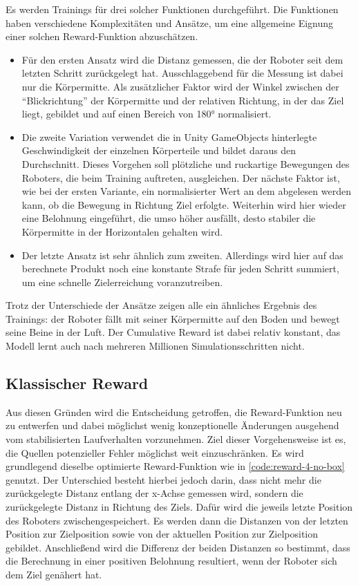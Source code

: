 Es werden Trainings für drei solcher Funktionen durchgeführt.
Die Funktionen haben verschiedene Komplexitäten und Ansätze, um eine allgemeine Eignung einer solchen Reward-Funktion abzuschätzen.
\begin{itemize}
    \item Für den ersten Ansatz wird die Distanz gemessen, die der Roboter seit dem letzten Schritt zurückgelegt hat.
    Ausschlaggebend für die Messung ist dabei nur die Körpermitte.
    Als zusätzlicher Faktor wird der Winkel zwischen der \enquote{Blickrichtung} der Körpermitte und der relativen Richtung, in der das Ziel liegt, gebildet und auf einen Bereich von 180° normalisiert.

    \item Die zweite Variation verwendet die in Unity GameObjects hinterlegte Geschwindigkeit der einzelnen Körperteile und bildet daraus den Durchschnitt.
    Dieses Vorgehen soll plötzliche und ruckartige Bewegungen des Roboters, die beim Training auftreten, ausgleichen.
    Der nächste Faktor ist, wie bei der ersten Variante, ein normalisierter Wert an dem abgelesen werden kann, ob die Bewegung in Richtung Ziel erfolgte.
    Weiterhin wird hier wieder eine Belohnung eingeführt, die umso höher ausfällt, desto stabiler die Körpermitte in der Horizontalen gehalten wird.

    \item Der letzte Ansatz ist sehr ähnlich zum zweiten.
    Allerdings wird hier auf das berechnete Produkt noch eine konstante Strafe für jeden Schritt summiert, um eine schnelle Zielerreichung voranzutreiben.
\end{itemize}

Trotz der Unterschiede der Ansätze zeigen alle ein ähnliches Ergebnis des Trainings: der Roboter fällt mit seiner Körpermitte auf den Boden und bewegt seine Beine in der Luft.
Der Cumulative Reward ist dabei relativ konstant, das Modell lernt auch nach mehreren Millionen Simulationsschritten nicht.

\subsection{Klassischer Reward}
\label{sec:classic-reward}
Aus diesen Gründen wird die Entscheidung getroffen, die Reward-Funktion neu zu entwerfen und dabei möglichst wenig konzeptionelle Änderungen ausgehend vom stabilisierten Laufverhalten vorzunehmen.
Ziel dieser Vorgehensweise ist es, die Quellen potenzieller Fehler möglichst weit einzuschränken.
Es wird grundlegend dieselbe optimierte Reward-Funktion wie in \autoref{code:reward-4-no-box} genutzt.
Der Unterschied besteht hierbei jedoch darin, dass nicht mehr die zurückgelegte Distanz entlang der x-Achse gemessen wird, sondern die zurückgelegte Distanz in Richtung des Ziels.
Dafür wird die jeweils letzte Position des Roboters zwischengespeichert.
Es werden dann die Distanzen von der letzten Position zur Zielposition sowie von der aktuellen Position zur Zielposition gebildet.
Anschließend wird die Differenz der beiden Distanzen so bestimmt, dass die Berechnung in einer positiven Belohnung resultiert, wenn der Roboter sich dem Ziel genähert hat.

